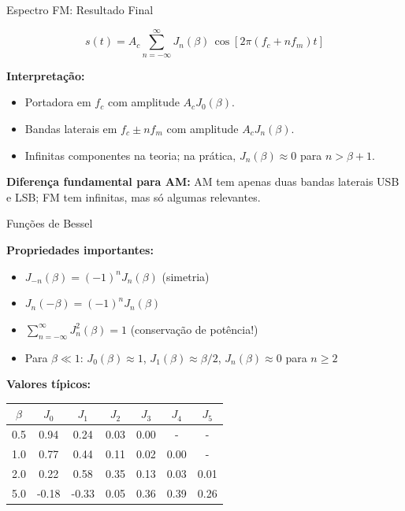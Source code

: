 \begin{frame}{Espectro FM: Resultado Final}

\[
s(t) = A_c \sum_{n=-\infty}^{\infty} J_n(\beta)\,\cos[2\pi(f_c + nf_m)t]
\]

\textbf{Interpretação:}
\begin{itemize}\itemsep0pt
\item Portadora em $f_c$ com amplitude $A_c J_0(\beta)$.
\item Bandas laterais em $f_c \pm nf_m$ com amplitude $A_c J_n(\beta)$.
\item Infinitas componentes na teoria; na prática, $J_n(\beta)\approx 0$ para $n > \beta + 1$.
\end{itemize}

\vspace{0.2cm}
\textbf{Diferença fundamental para AM:} AM tem apenas duas bandas laterais USB e LSB; FM tem infinitas, mas só algumas relevantes.

\end{frame}


\begin{frame}{Funções de Bessel}

\textbf{Propriedades importantes:}

\begin{itemize}
\item $J_{-n}(\beta) = (-1)^n J_n(\beta)$ (simetria)
\item $J_n(-\beta) = (-1)^n J_n(\beta)$
\item $\sum_{n=-\infty}^{\infty} J_n^2(\beta) = 1$ (conservação de potência!)
\item Para $\beta \ll 1$: $J_0(\beta) \approx 1$, $J_1(\beta) \approx \beta/2$, $J_n(\beta) \approx 0$ para $n \geq 2$
\end{itemize}

\vspace{0.3cm}

\textbf{Valores típicos:}

\begin{center}
\footnotesize
\begin{tabular}{|c|c|c|c|c|c|c|}
\hline
$\beta$ & $J_0$ & $J_1$ & $J_2$ & $J_3$ & $J_4$ & $J_5$ \\
\hline
0.5 & 0.94 & 0.24 & 0.03 & 0.00 & - & - \\
\hline
1.0 & 0.77 & 0.44 & 0.11 & 0.02 & 0.00 & - \\
\hline
2.0 & 0.22 & 0.58 & 0.35 & 0.13 & 0.03 & 0.01 \\
\hline
5.0 & -0.18 & -0.33 & 0.05 & 0.36 & 0.39 & 0.26 \\
\hline
\end{tabular}
\end{center}

\end{frame}


